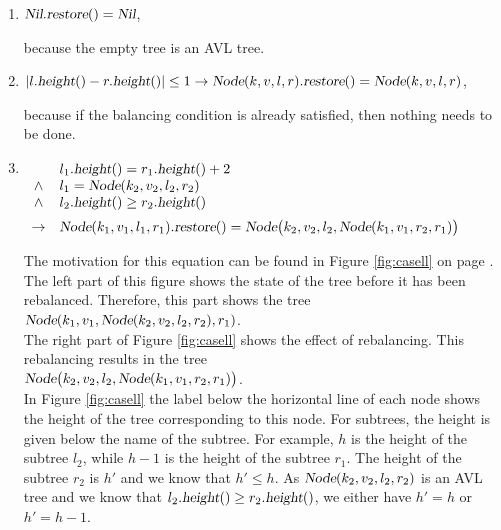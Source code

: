 \begin{enumerate}
\item $\textsl{Nil}.\textsl{restore}() = \textsl{Nil}$,

      because the empty tree is an  AVL tree.
\item $|l.\textsl{height}() - r.\textsl{height}()| \leq 1 \rightarrow 
       \textsl{Node}(k,v,l,r).\textsl{restore}() = \textsl{Node}(k,v,l,r)$,

      because if the balancing condition is already satisfied, then nothing needs to be done. 
\item $\begin{array}[t]{cl}
              & l_1.\textsl{height}() = r_1.\textsl{height}() + 2    \\ 
       \wedge & l_1 = \textsl{Node}(k_2,v_2,l_2,r_2)                 \\
       \wedge & l_2.\textsl{height}() \geq r_2.\textsl{height}()     \\[0.2cm]
       \rightarrow & \textsl{Node}(k_1,v_1,l_1,r_1).\textsl{restore}() = 
                     \textsl{Node}\bigl(k_2,v_2,l_2,\textsl{Node}(k_1,v_1,r_2,r_1)\bigr)
       \end{array}
      $

      The motivation for this equation can be found in Figure \ref{fig:casell}
      on page \pageref{fig:casell}.  The left part of this figure shows the state
      of the tree before it has been rebalanced.  Therefore, this part shows the tree
      \\[0.2cm]
      \hspace*{1.3cm}
      $\textsl{Node}(k_1,v_1, \textsl{Node}(k_2,v_2,l_2,r_2), r_1)$. 
      \\[0.2cm]
      The right part of Figure \ref{fig:casell} shows the effect of rebalancing.  
      This rebalancing results in the tree
      \\[0.2cm]
      \hspace*{1.3cm}
      $\textsl{Node}\bigl(k_2,v_2,l_2,\textsl{Node}(k_1,v_1,r_2,r_1)\bigr)$.
      \\[0.2cm]
      In Figure \ref{fig:casell} the label below the horizontal line of each node shows the height
      of the tree corresponding to this node.  For subtrees, the height is given below the name of
      the subtree.  For example,  $h$ is the height of the subtree 
      $l_2$, while $h-1$ is the height of the subtree $r_1$. The height of the subtree $r_2$
      is $h'$ and we know that $h' \leq h$.  As $\textsl{Node}(k_2,v_2,l_2,r_2)$ is an AVL tree and we know that
      $l_2.\textsl{height}() \geq r_2.\textsl{height}()$, we
      either have $h' = h$ or $h' = h-1$.


\end{enumerate}
